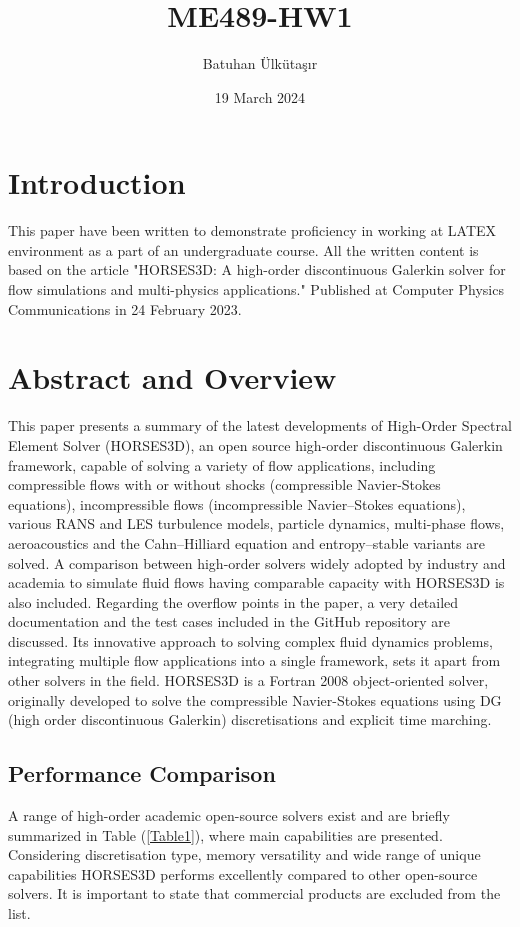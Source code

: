 \documentclass{article}
\title{ME489-HW1}
\author{Batuhan Ülkütaşır}
\date{19 March 2024}
\begin{document}
	
	\maketitle
	
	\section{Introduction}
	This paper have been written to demonstrate proficiency in working at LATEX environment as a part of an undergraduate course. All the written content is  based on the article "HORSES3D: A high-order discontinuous Galerkin solver for flow simulations and multi-physics applications." \cite{ferrer2023high} Published at Computer Physics Communications in 24 February 2023.
	\section{Abstract and Overview}
	
	This paper presents a summary of the latest developments of High-Order Spectral Element Solver (HORSES3D), an open source high-order discontinuous Galerkin framework, capable of solving a variety of flow applications, including compressible flows with or without shocks (compressible Navier-Stokes equations), incompressible flows (incompressible Navier–Stokes equations), various RANS and LES turbulence models, particle dynamics, multi-phase flows, aeroacoustics and the Cahn–Hilliard equation and entropy–stable variants are solved. A comparison between high-order solvers widely adopted by industry and academia to simulate fluid flows having comparable capacity with HORSES3D is also included. Regarding the overflow points in the paper, a very detailed documentation and the test cases included in the GitHub repository are discussed. Its innovative approach to solving complex fluid dynamics problems, integrating multiple flow applications into a single framework, sets it apart from other solvers in the field. HORSES3D is a Fortran 2008 object-oriented solver, originally developed to solve the compressible Navier-Stokes equations using DG (high order discontinuous Galerkin) discretisations and explicit time marching.
	
	\subsection{Performance Comparison}
	A range of high-order academic open-source solvers exist and are briefly summarized in Table (\ref{Table1}), where main capabilities are presented. Considering discretisation type, memory versatility and wide range of unique capabilities HORSES3D performs excellently compared to other open-source solvers. It is important to state that commercial products are excluded from the list.
	
\end{document}
